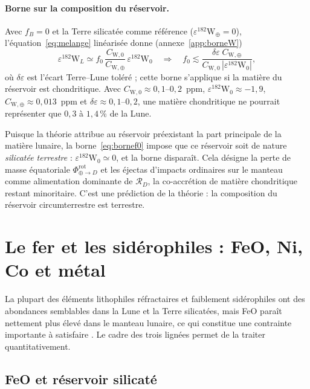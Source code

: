 \documentclass[11pt,a4paper,openany]{report}
\newcommand{\RD}{\mathcal{R}_{D}}
\begin{document}
\paragraph{Borne sur la composition du réservoir.}
Avec $f_B=0$ et la Terre silicatée comme référence ($\varepsilon^{182}\mathrm{W}_\oplus=0$),
l'équation~\eqref{eq:melange} linéarisée donne (annexe~\ref{app:borneW})
\begin{equation}
\varepsilon^{182}\mathrm{W}_L\simeq f_0\,\frac{C_{\mathrm{W},0}}{C_{\mathrm{W},\oplus}}\,
\varepsilon^{182}\mathrm{W}_0
\quad\Longrightarrow\quad
f_0\lesssim\frac{\delta\varepsilon\;C_{\mathrm{W},\oplus}}{C_{\mathrm{W},0}\,|\varepsilon^{182}\mathrm{W}_0|},
\label{eq:bornef0}
\end{equation}
où $\delta\varepsilon$ est l'écart Terre--Lune toléré ; cette borne s'applique si la matière du réservoir
est chondritique. Avec $C_{\mathrm{W},0}\approx0{,}1$--$0{,}2$~ppm,
$\varepsilon^{182}\mathrm{W}_0\approx-1{,}9$, $C_{\mathrm{W},\oplus}\approx0{,}013$~ppm et
$\delta\varepsilon\approx0{,}1$--$0{,}2$, une matière chondritique ne pourrait représenter que
$0{,}3$ à $1{,}4\,\%$ de la Lune.

\begin{lecture}
Puisque la théorie attribue au réservoir préexistant la part principale de la matière lunaire, la
borne~\eqref{eq:bornef0} impose que ce réservoir soit de nature \emph{silicatée terrestre} :
$\varepsilon^{182}\mathrm{W}_0\simeq0$, et la borne disparaît. Cela désigne la perte de masse
équatoriale $\Phi^{\mathrm{rot}}_{\oplus\to D}$ et les éjectas d'impacts ordinaires sur le manteau comme
alimentation dominante de $\RD$, la co-accrétion de matière chondritique restant minoritaire. C'est
une prédiction de la théorie : la composition du réservoir circumterrestre est terrestre.
\end{lecture}

\section{Le fer et les sidérophiles : FeO, Ni, Co et métal}

La plupart des éléments lithophiles réfractaires et faiblement sidérophiles ont des abondances
semblables dans la Lune et la Terre silicatées, mais FeO paraît nettement plus élevé dans le
manteau lunaire, ce qui constitue une contrainte importante à satisfaire \cite{Canup2023}. Le cadre des trois lignées permet de la traiter quantitativement.

\subsection{FeO et réservoir silicaté}
\end{document}

